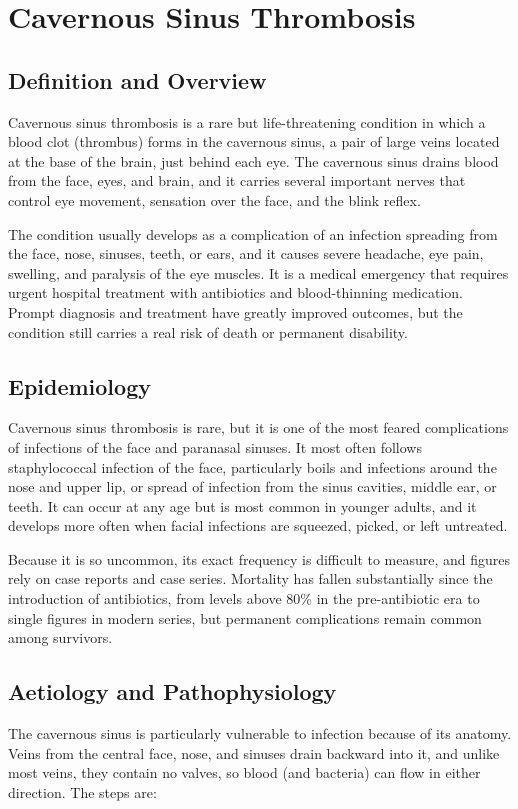 \chapter{Cavernous Sinus Thrombosis}

\section*{Definition and Overview}
Cavernous sinus thrombosis is a rare but life-threatening condition in which a blood clot (thrombus) forms in the cavernous sinus, a pair of large veins located at the base of the brain, just behind each eye. The cavernous sinus drains blood from the face, eyes, and brain, and it carries several important nerves that control eye movement, sensation over the face, and the blink reflex.

The condition usually develops as a complication of an infection spreading from the face, nose, sinuses, teeth, or ears, and it causes severe headache, eye pain, swelling, and paralysis of the eye muscles. It is a medical emergency that requires urgent hospital treatment with antibiotics and blood-thinning medication. Prompt diagnosis and treatment have greatly improved outcomes, but the condition still carries a real risk of death or permanent disability.

\section*{Epidemiology}
Cavernous sinus thrombosis is rare, but it is one of the most feared complications of infections of the face and paranasal sinuses. It most often follows staphylococcal infection of the face, particularly boils and infections around the nose and upper lip, or spread of infection from the sinus cavities, middle ear, or teeth. It can occur at any age but is most common in younger adults, and it develops more often when facial infections are squeezed, picked, or left untreated.

Because it is so uncommon, its exact frequency is difficult to measure, and figures rely on case reports and case series. Mortality has fallen substantially since the introduction of antibiotics, from levels above 80\% in the pre-antibiotic era to single figures in modern series, but permanent complications remain common among survivors.

\section*{Aetiology and Pathophysiology}
The cavernous sinus is particularly vulnerable to infection because of its anatomy. Veins from the central face, nose, and sinuses drain backward into it, and unlike most veins, they contain no valves, so blood (and bacteria) can flow in either direction. The steps are:

